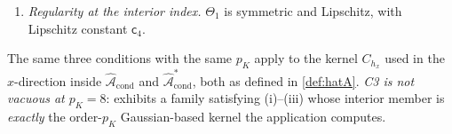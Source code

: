 \begin{assumption}
\begin{enumerate}
\begin{equation}
\int_{I}\varsigma^{\,j}\,\Theta_{I}(\varsigma)\,d\varsigma\;=\;\delta_{j0}
\qquad (0\le j\le p_K-1),
\end{equation}
with $\delta_{j0}$ the Kronecker symbol. Write
\begin{equation}\label{eq:envconst}
\mathsf c_2\;:=\;\|\bar\Theta\|_\infty ,
\qquad
c_C\;:=\;\frac{\|\bar\Theta\|_{L^{1}}}{2\,\mathsf c_2} ,
\qquad\text{so that}\qquad
\int_\IR\bar\Theta\;=\;2\,c_C\,\mathsf c_2 .
\end{equation}
\item[(iii)] \emph{Regularity at the interior index.} $\Theta_1$ is symmetric and Lipschitz, with
Lipschitz constant $\mathsf c_4$.
\end{enumerate}
The same three conditions with the same $p_K$ apply to the kernel $C_{h_x}$ used in the $x$-direction
inside $\hat{\mathcal A}_{\mathrm{cond}}$ and $\hat{\mathcal A}^\ast_{\mathrm{cond}}$, both as defined in
\cref{def:hatA}. \emph{C3 is not vacuous at $p_K=8$}:  exhibits a family
satisfying \textup{(i)}--\textup{(iii)} whose interior member is \emph{exactly} the order-$p_K$
Gaussian-based kernel the application computes.
\end{assumption}

